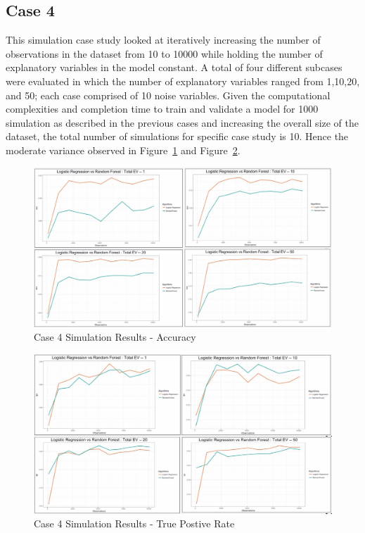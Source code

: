 \documentclass{llncs}
\begin{document}
\subsection{Case 4}
\noindent 
This simulation case study looked at iteratively increasing the number of observations in the dataset from 10 to 10000 while holding the number of explanatory variables in the model constant. A total of four different subcases were evaluated in which the number of explanatory variables ranged from 1,10,20, and 50; each case comprised of 10 noise variables. Given the computational complexities and completion time to train and validate a model for 1000 simulation as described in the previous cases and increasing the overall size of the dataset, the total number of simulations for specific case study is 10. Hence the moderate variance observed in Figure~\ref{fig:case4_acc_results} and Figure~\ref{fig:case4_tpr_results}. 

\begin{figure}
\centering
\includegraphics[scale=0.55]{case4_acc.png}
\caption{Case 4 Simulation Results - Accuracy}
\label{fig:case4_acc_results}
\end{figure}

\begin{figure}
\centering
\includegraphics[scale=0.55]{case4_tpr.png}
\caption{Case 4 Simulation Results - True Postive Rate}
\label{fig:case4_tpr_results}
\end{figure}
\end{document}
